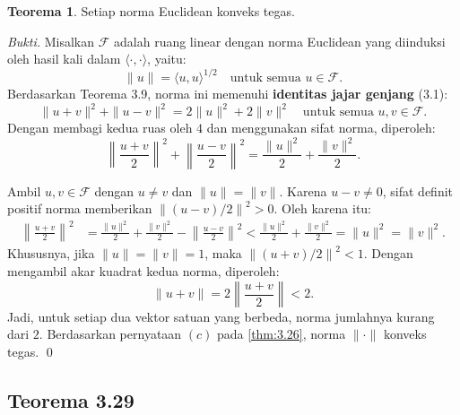 \documentclass[aspectratio=169,11pt]{beamer}
\theoremstyle{definition}
\newtheorem{teorema}{Teorema}
\newcommand{\myref}[1]{\hyperref[#1]{\nameCref{#1} \ref*{#1}}}
\begin{document}
\begin{frame}[allowframebreaks=1]{\insertsection}{\insertsubsection}
  \setcounter{teorema}{27}
  \begin{teorema}
    Setiap norma Euclidean konveks tegas.\label{thm:3.28}
  \end{teorema}
  \textit{Bukti.}
  Misalkan $\mathcal{F}$ adalah ruang linear dengan norma Euclidean yang diinduksi oleh hasil kali dalam $\langle\cdot,\cdot\rangle$, yaitu:
  \begin{equation*}
    \|u\| = \langle u,u\rangle^{1/2} \quad \text{untuk semua } u \in \mathcal{F}.
  \end{equation*}
  Berdasarkan Teorema 3.9, norma ini memenuhi \textbf{identitas jajar genjang} (3.1):
  \begin{equation*}
    \|u+v\|^2 + \|u-v\|^2 = 2\|u\|^2 + 2\|v\|^2
    \quad \text{untuk semua } u,v \in \mathcal{F}.
  \end{equation*}
  Dengan membagi kedua ruas oleh $4$ dan menggunakan sifat norma, diperoleh:
  \begin{equation*}
    \left\|\frac{u+v}{2}\right\|^2 + \left\|\frac{u-v}{2}\right\|^2
    = \frac{\|u\|^2}{2} + \frac{\|v\|^2}{2}.
  \end{equation*}


  Ambil $u,v \in \mathcal{F}$ dengan $u \neq v$ dan $\|u\| = \|v\|$. Karena $u-v \neq 0$, sifat definit positif norma memberikan $\left\|(u-v)/2\right\|^2 > 0$. Oleh karena itu:
  \begin{align*}
    \left\|\frac{u+v}{2}\right\|^2
     & = \frac{\|u\|^2}{2} + \frac{\|v\|^2}{2}
    - \left\|\frac{u-v}{2}\right\|^2 < \frac{\|u\|^2}{2} + \frac{\|v\|^2}{2}
    = \|u\|^2 = \|v\|^2.
  \end{align*}
  Khususnya, jika $\|u\| = \|v\| = 1$, maka $\left\|(u+v)/2\right\|^2 < 1$. Dengan mengambil akar kuadrat kedua norma, diperoleh:
  \begin{equation*}
    \|u+v\| = 2\left\|\frac{u+v}{2}\right\| < 2.
  \end{equation*}
  Jadi, untuk setiap dua vektor satuan yang berbeda, norma jumlahnya kurang dari $2$. Berdasarkan pernyataan $(c)$ pada \myref{thm:3.26}, norma $\|\cdot\|$ konveks tegas. \qed
\end{frame}

\subsection{Teorema 3.29}
\end{document}
